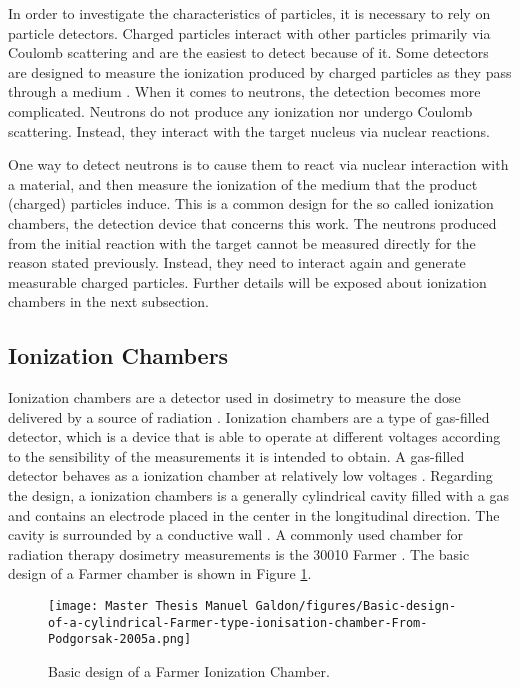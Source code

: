 In order to investigate the characteristics of particles, it is necessary to rely on particle detectors. Charged particles interact with other particles primarily via Coulomb scattering and are the easiest to detect because of it. Some detectors are designed to measure the ionization produced by charged particles as they pass through a medium \cite{IntroToNuclearAndParticle}. When it comes to neutrons, the detection becomes more complicated. Neutrons do not produce any ionization nor undergo Coulomb scattering. Instead, they interact with the target nucleus via nuclear reactions.

One way to detect neutrons is to cause them to react via nuclear interaction with a material, and then measure the ionization of the medium that the product (charged) particles induce. This is a common design for the so called ionization chambers, the detection device that concerns this work. The neutrons produced from the initial reaction with the target cannot be measured directly for the reason stated previously. Instead, they need to interact again and generate measurable charged particles. Further details will be exposed about ionization chambers in the next subsection. 

\subsection{Ionization Chambers}

Ionization chambers are a detector used in dosimetry to measure the dose delivered by a source of radiation \cite{RadiationOncologyInPhysicsHandbook}. Ionization chambers are a type of gas-filled detector, which is a device that is able to operate at different voltages according to the sensibility of the measurements it is intended to obtain. A gas-filled detector behaves as a ionization chamber at relatively low voltages \cite{IntroToNuclearAndParticle}. Regarding the design, a ionization chambers is a generally cylindrical cavity filled with a gas and contains an electrode placed in the center in the longitudinal direction. The cavity is surrounded by a conductive wall \cite{RadiationOncologyInPhysicsHandbook}. A commonly used chamber for radiation therapy dosimetry measurements is the 30010 Farmer \cite{PTWFarmer}. The basic design of a Farmer chamber is shown in Figure \ref{fig:Basic design of a Farmer ionization chamber}.



\begin{figure}[!h]
    \centering
    \texttt{[image: Master Thesis Manuel Galdon/figures/Basic-design-of-a-cylindrical-Farmer-type-ionisation-chamber-From-Podgorsak-2005a.png]}
    \caption{Basic design of a Farmer Ionization Chamber.}
    \label{fig:Basic design of a Farmer ionization chamber}
\end{figure}

